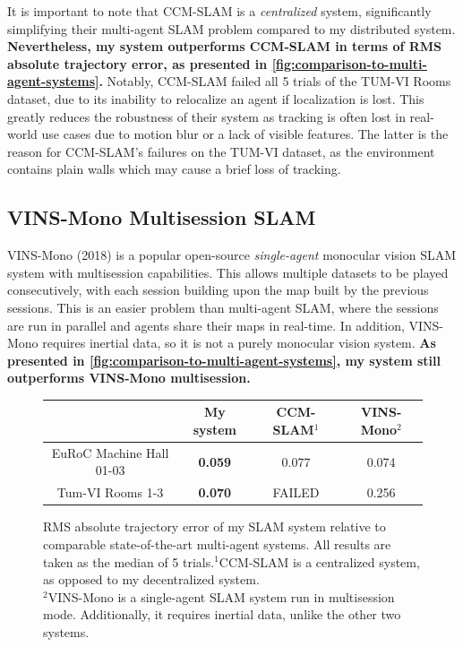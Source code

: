 It is important to note that CCM-SLAM is a \textit{centralized} system, significantly simplifying their multi-agent SLAM problem compared to my distributed system. \textbf{Nevertheless, my system outperforms CCM-SLAM in terms of RMS absolute trajectory error, as presented in \autoref{fig:comparison-to-multi-agent-systems}.} Notably, CCM-SLAM failed all 5 trials of the TUM-VI Rooms dataset, due to its inability to relocalize an agent if localization is lost. This greatly reduces the robustness of their system as tracking is often lost in real-world use cases due to motion blur or a lack of visible features. The latter is the reason for CCM-SLAM's failures on the TUM-VI dataset, as the environment contains plain walls which may cause a brief loss of tracking.


\subsection{VINS-Mono Multisession SLAM}
VINS-Mono (2018) \autocite{8421746} is a popular open-source \textit{single-agent} monocular vision SLAM system with multisession capabilities. This allows multiple datasets to be played consecutively, with each session building upon the map built by the previous sessions. This is an easier problem than multi-agent SLAM, where the sessions are run in parallel and agents share their maps in real-time. In addition, VINS-Mono requires inertial data, so it is not a purely monocular vision system. \textbf{As presented in \autoref{fig:comparison-to-multi-agent-systems}, my system still outperforms VINS-Mono multisession.}


\begin{figure}[h]
    \centering
    \def\arraystretch{1.2}
    \small
    \begin{tabular}{ |c|c|c|c| }
        \cline{2-4}
        \multicolumn{1}{c|}{}    & \textbf{My system} & CCM-SLAM$^1$ & VINS-Mono$^2$ \\
        \hline
        EuRoC Machine Hall 01-03 & \textbf{0.059}     & 0.077        & 0.074         \\
        \hline
        Tum-VI Rooms 1-3         & \textbf{0.070}     & FAILED       & 0.256         \\
        \hline
    \end{tabular}

    \caption{RMS absolute trajectory error of my SLAM system relative to comparable state-of-the-art multi-agent systems. All results are taken as the median of 5 trials.\captionbreak $^1$CCM-SLAM is a centralized system, as opposed to my decentralized system. \\ $^2$VINS-Mono is a single-agent SLAM system run in multisession mode. Additionally, it requires inertial data, unlike the other two systems.}
    \label{fig:comparison-to-multi-agent-systems}
\end{figure}


